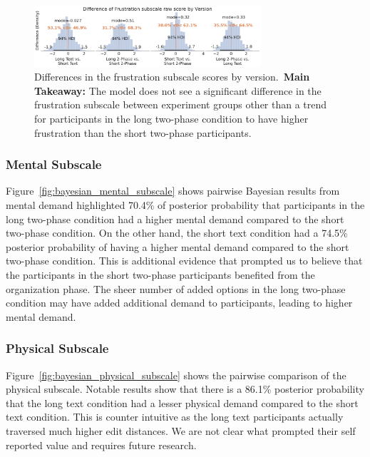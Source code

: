 \begin{figure}[h!]
    \centering
    \includegraphics[width=0.75\textwidth]{content/image/cog/Frustration_cog_diff_single_row.pdf}
    \caption{Differences in the frustration subscale scores by version.~\textbf{Main Takeaway:} The model does not see a significant difference in the frustration subscale between experiment groups other than a trend for participants in the long two-phase condition to have higher frustration than the short two-phase participants.}
    \label{fig:bayesian_frustration_subscale}
\end{figure}

\subsubsection{Mental Subscale}
Figure~\ref{fig:bayesian_mental_subscale} shows pairwise Bayesian results from mental demand highlighted 70.4\% of posterior probability that participants in the long two-phase condition had a higher mental demand compared to the short two-phase condition. On the other hand, the short text condition had a 74.5\% posterior probability of having a higher mental demand compared to the short two-phase condition. This is additional evidence that prompted us to believe that the participants in the short two-phase participants benefited from the organization phase. The sheer number of added options in the long two-phase condition may have added additional demand to participants, leading to higher mental demand.

\subsubsection{Physical Subscale}
Figure~\ref{fig:bayesian_physical_subscale} shows the pairwise comparison of the physical subscale. Notable results show that there is a 86.1\% posterior probability that the long text condition had a lesser physical demand compared to the short text condition. This is counter intuitive as the long text participants actually traversed much higher edit distances. We are not clear what prompted their self reported value and requires future research. 

